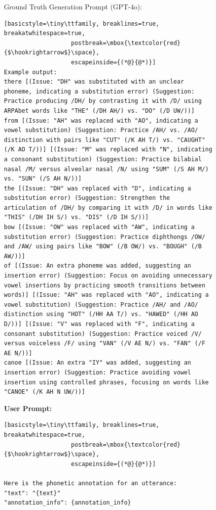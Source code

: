 \documentclass[11pt]{article}
\begin{document}
\begin{figure}[ht]
\begin{AIBox}{Ground Truth Generation Prompt (GPT-4o):}
\begin{minipage}[t]{\textwidth}
\begin{lstlisting}[basicstyle=\tiny\ttfamily, breaklines=true, breakatwhitespace=true,
                   postbreak=\mbox{\textcolor{red}{$\hookrightarrow$}\space},
                   escapeinside={(*@}{@*)}]
Example output:
there [(Issue: "DH" was substituted with an unclear phoneme, indicating a substitution error) (Suggestion: Practice producing /DH/ by contrasting it with /D/ using ARPAbet words like "THE" (/DH AH/) vs. "DO" (/D UW/))]
from [(Issue: "AH" was replaced with "AO", indicating a vowel substitution) (Suggestion: Practice /AH/ vs. /AO/ distinction with pairs like "CUT" (/K AH T/) vs. "CAUGHT" (/K AO T/))] [(Issue: "M" was replaced with "N", indicating a consonant substitution) (Suggestion: Practice bilabial nasal /M/ versus alveolar nasal /N/ using "SUM" (/S AH M/) vs. "SUN" (/S AH N/))]
the [(Issue: "DH" was replaced with "D", indicating a substitution error) (Suggestion: Strengthen the articulation of /DH/ by comparing it with /D/ in words like "THIS" (/DH IH S/) vs. "DIS" (/D IH S/))]
bow [(Issue: "OW" was replaced with "AW", indicating a substitution error) (Suggestion: Practice diphthongs /OW/ and /AW/ using pairs like "BOW" (/B OW/) vs. "BOUGH" (/B AW/))]
of [(Issue: An extra phoneme was added, suggesting an insertion error) (Suggestion: Focus on avoiding unnecessary vowel insertions by practicing smooth transitions between words)] [(Issue: "AH" was replaced with "AO", indicating a vowel substitution) (Suggestion: Practice /AH/ and /AO/ distinction using "HOT" (/HH AA T/) vs. "HAWED" (/HH AO D/))] [(Issue: "V" was replaced with "F", indicating a consonant substitution) (Suggestion: Practice voiced /V/ versus voiceless /F/ using "VAN" (/V AE N/) vs. "FAN" (/F AE N/))]
canoe [(Issue: An extra "IY" was added, suggesting an insertion error) (Suggestion: Practice avoiding vowel insertion using controlled phrases, focusing on words like "CANOE" (/K AH N UW/))]
\end{lstlisting}

\end{minipage}

\tcbline

\begin{minipage}[t]{\textwidth}
\begin{RaggedRight}
{\bf User Prompt:} \scriptsize
\begin{lstlisting}[basicstyle=\tiny\ttfamily, breaklines=true, breakatwhitespace=true,
                   postbreak=\mbox{\textcolor{red}{$\hookrightarrow$}\space},
                   escapeinside={(*@}{@*)}]

Here is the phonetic annotation for an utterance:
"text": "{text}"
"annotation_info": {annotation_info}


\end{lstlisting}
\end{RaggedRight}
\end{minipage}
\end{AIBox}
\end{figure}
\end{document}
